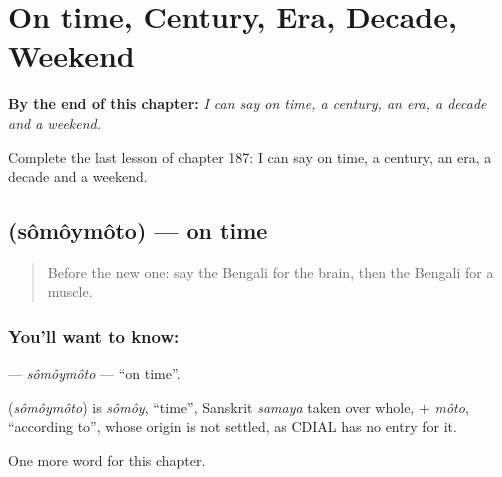 
\chapter{On time, Century, Era, Decade, Weekend}
\label{ch:bn-on-time-century-era-decade-weekend}

\begin{chapteropening}
\textbf{By the end of this chapter:} \emph{I can say on time, a century, an era, a decade and a weekend.}

Complete the last lesson of chapter 187: I can say on time, a century, an era, a decade and a weekend.
\end{chapteropening}

\section[\texorpdfstring{\bn{সময়মতো} (sômôymôto)}{সময়মতো (sômôymôto)}]{ (sômôymôto) — on time}

\label{lesson:BN-C187-somoymoto}



\begin{quote}
Before the new one: say the Bengali for the brain, then the Bengali for a muscle.
\end{quote}

\subsection*{You'll want to know: }
\textbf{} — \emph{sômôymôto} — \textquotedblleft{}on time\textquotedblright{}.

\begin{cousinweb}
\textbf{} (\emph{sômôymôto}) is \emph{sômôy}, \textquotedblleft{}time\textquotedblright{}, Sanskrit \emph{samaya} taken over whole, + \emph{môto}, \textquotedblleft{}according to\textquotedblright{}, whose origin is not settled, as CDIAL has no entry for it.
\end{cousinweb}

\begin{grammarlens}[title={What you've built}]
One more word for this chapter.
\end{grammarlens}

